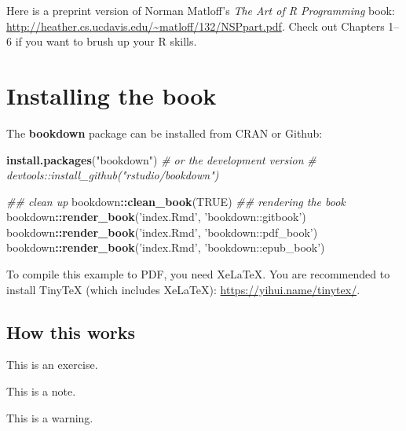 \documentclass[12pt,]{book}
\newenvironment{Shaded}{\begin{snugshade}}{\end{snugshade}}
\newcommand{\CommentTok}[1]{\textcolor[rgb]{0.56,0.35,0.01}{\textit{#1}}}
\newcommand{\KeywordTok}[1]{\textcolor[rgb]{0.13,0.29,0.53}{\textbf{#1}}}
\newcommand{\NormalTok}[1]{#1}
\newcommand{\OperatorTok}[1]{\textcolor[rgb]{0.81,0.36,0.00}{\textbf{#1}}}
\newcommand{\OtherTok}[1]{\textcolor[rgb]{0.56,0.35,0.01}{#1}}
\newcommand{\StringTok}[1]{\textcolor[rgb]{0.31,0.60,0.02}{#1}}
\let\BeginKnitrBlock\begin \let\EndKnitrBlock\end
\begin{document}
Here is a preprint version of Norman Matloff's \emph{The Art of R Programming} book: \url{http://heather.cs.ucdavis.edu/~matloff/132/NSPpart.pdf}.
Check out Chapters 1--6 if you want to brush up your R skills.

\hypertarget{installing-the-book}{%
\section*{Installing the book}\label{installing-the-book}}

The \textbf{bookdown} package can be installed from CRAN or Github:

\begin{Shaded}
\begin{Highlighting}[]
\KeywordTok{install.packages}\NormalTok{(}\StringTok{"bookdown"}\NormalTok{)}
\CommentTok{# or the development version}
\CommentTok{# devtools::install_github("rstudio/bookdown")}

\CommentTok{## clean up }
\NormalTok{bookdown}\OperatorTok{::}\KeywordTok{clean_book}\NormalTok{(}\OtherTok{TRUE}\NormalTok{)}
\CommentTok{## rendering the book}
\NormalTok{bookdown}\OperatorTok{::}\KeywordTok{render_book}\NormalTok{(}\StringTok{'index.Rmd'}\NormalTok{, }\StringTok{'bookdown::gitbook'}\NormalTok{)}
\NormalTok{bookdown}\OperatorTok{::}\KeywordTok{render_book}\NormalTok{(}\StringTok{'index.Rmd'}\NormalTok{, }\StringTok{'bookdown::pdf_book'}\NormalTok{)}
\NormalTok{bookdown}\OperatorTok{::}\KeywordTok{render_book}\NormalTok{(}\StringTok{'index.Rmd'}\NormalTok{, }\StringTok{'bookdown::epub_book'}\NormalTok{)}
\end{Highlighting}
\end{Shaded}

To compile this example to PDF, you need XeLaTeX. You are recommended to install TinyTeX (which includes XeLaTeX): \url{https://yihui.name/tinytex/}.

\hypertarget{how-this-works}{%
\subsection*{How this works}\label{how-this-works}}

\BeginKnitrBlock{rmdexercise}
This is an exercise.
\EndKnitrBlock{rmdexercise}

\BeginKnitrBlock{rmdnote}
This is a note.
\EndKnitrBlock{rmdnote}

\BeginKnitrBlock{rmdwarning}
This is a warning.
\EndKnitrBlock{rmdwarning}
\end{document}
